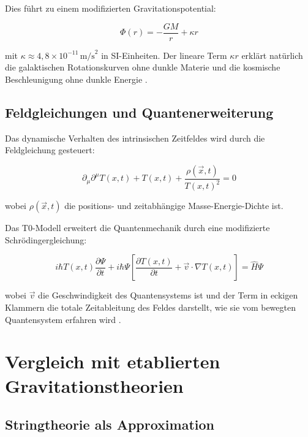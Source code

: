 \documentclass[12pt,a4paper]{article}
\newcommand{\Tfieldt}{T(x,t)}
\newcommand{\vecx}{\vec{x}}
\begin{document}
	Dies führt zu einem modifizierten Gravitationspotential:
	
	\begin{equation}
		\Phi(r) = -\frac{GM}{r} + \kappa r
		\label{eq:modified_potential}
	\end{equation}
	
	mit $\kappa \approx 4,8 \times 10^{-11} \, \text{m/s}^2$ in SI-Einheiten. Der lineare Term $\kappa r$ erklärt natürlich die galaktischen Rotationskurven ohne dunkle Materie und die kosmische Beschleunigung ohne dunkle Energie \cite{pascher_galaxies_2025}.
	
	\subsection{Feldgleichungen und Quantenerweiterung}
	\label{subsec:field_equations}
	
	Das dynamische Verhalten des intrinsischen Zeitfeldes wird durch die Feldgleichung gesteuert:
	
	\begin{equation}
		\partial_{\mu}\partial^{\mu}\Tfieldt + \Tfieldt + \frac{\rho(\vecx,t)}{\Tfieldt^2} = 0
		\label{eq:field_equation}
	\end{equation}
	
	wobei $\rho(\vecx,t)$ die positions- und zeitabhängige Masse-Energie-Dichte ist.
	
	Das T0-Modell erweitert die Quantenmechanik durch eine modifizierte Schrödingergleichung:
	
	\begin{equation}
		i\hbar \Tfieldt \frac{\partial\Psi}{\partial t} + i\hbar \Psi \left[\frac{\partial \Tfieldt}{\partial t} + \vec{v}\cdot\nabla\Tfieldt\right] = \hat{H} \Psi
		\label{eq:modified_schrodinger}
	\end{equation}
	
	wobei $\vec{v}$ die Geschwindigkeit des Quantensystems ist und der Term in eckigen Klammern die totale Zeitableitung des Feldes darstellt, wie sie vom bewegten Quantensystem erfahren wird \cite{pascher_quantum_2025}.
	
	\section{Vergleich mit etablierten Gravitationstheorien}
	\label{sec:comparison}
	
	\subsection{Stringtheorie als Approximation}
	\label{subsec:string_theory}
	
\end{document}
